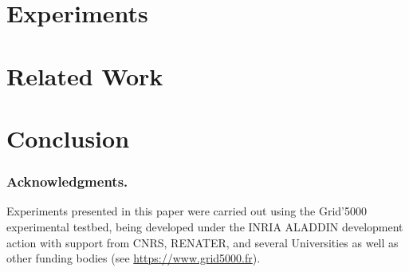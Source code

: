\documentclass[runningheads,a4paper]{llncs2e/llncs}
\begin{document}
\section{Experiments}
\label{sec:exps}


\section{Related Work}
\label{sec:related}


\section{Conclusion}
\label{sec:con}


%
%
%
%
%
%
%

%
%

%

\subsubsection{Acknowledgments.}
Experiments presented in this paper were carried out using the Grid'5000 experimental
testbed, being developed under the INRIA ALADDIN development action with support from
CNRS, RENATER, and several Universities as well as other funding bodies (see
\url{https://www.grid5000.fr}).



\end{document}
